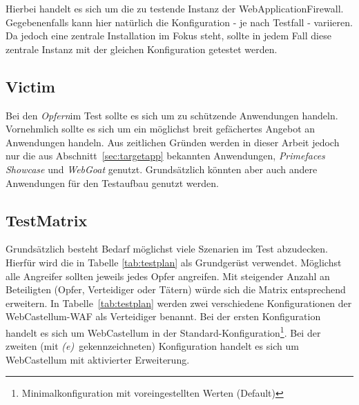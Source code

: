 Hierbei handelt es sich um die zu testende Instanz der WebApplicationFirewall. Gegebenenfalls kann hier natürlich die Konfiguration - je nach Testfall - variieren. Da jedoch eine zentrale Installation im Fokus steht, sollte in jedem Fall diese zentrale Instanz mit der gleichen Konfiguration getestet werden. 

\subsection{Victim}

Bei den \glqq\emph{Opfern}\grqq  im Test sollte es sich um zu schützende Anwendungen handeln. Vornehmlich sollte es sich um ein möglichst breit gefächertes Angebot an Anwendungen handeln. Aus zeitlichen Gründen werden in dieser Arbeit jedoch nur die aus Abschnitt~\ref{sec:targetapp} bekannten Anwendungen, \emph{Primefaces Showcase} und \emph{WebGoat} genutzt. Grundsätzlich könnten aber auch andere Anwendungen für den Testaufbau genutzt werden.\\ 

\subsection{TestMatrix}
Grundsätzlich besteht Bedarf möglichst viele Szenarien im Test abzudecken. Hierfür wird die in Tabelle \ref{tab:testplan} als Grundgerüst verwendet. Möglichst alle Angreifer sollten jeweils jedes Opfer angreifen. Mit steigender Anzahl an Beteiligten (Opfer, Verteidiger oder Tätern) würde sich die Matrix entsprechend erweitern. In Tabelle~\ref{tab:testplan} werden zwei verschiedene Konfigurationen der WebCastellum-WAF als Verteidiger benannt. Bei der ersten Konfiguration handelt es sich um WebCastellum in der Standard-Konfiguration\footnote{Minimalkonfiguration mit voreingestellten Werten (Default)}. Bei der zweiten (mit \emph{(e)}\ gekennzeichneten) Konfiguration handelt es sich um WebCastellum mit aktivierter Erweiterung.

